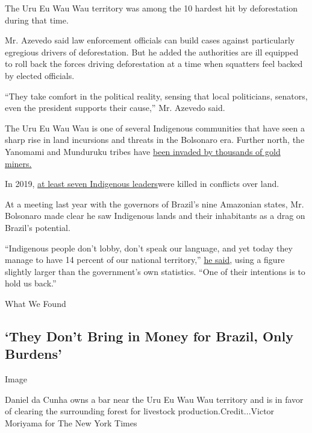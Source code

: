 The Uru Eu Wau Wau territory was among the 10 hardest hit by
deforestation during that time.

Mr. Azevedo said law enforcement officials can build cases against
particularly egregious drivers of deforestation. But he added the
authorities are ill equipped to roll back the forces driving
deforestation at a time when squatters feel backed by elected officials.

``They take comfort in the political reality, sensing that local
politicians, senators, even the president supports their cause,'' Mr.
Azevedo said.

The Uru Eu Wau Wau is one of several Indigenous communities that have
seen a sharp rise in land incursions and threats in the Bolsonaro era.
Further north, the Yanomami and Munduruku tribes have
\href{https://news.mongabay.com/2019/07/yanomami-amazon-reserve-invaded-by-20000-miners-bolsonaro-fails-to-act/}{been
invaded by thousands of gold miners.}

In 2019,
\href{https://g1.globo.com/natureza/noticia/2019/12/10/mortes-de-liderancas-indigenas-batem-recorde-em-2019-diz-pastoral-da-terra.ghtml}{at
least seven Indigenous leaders}were killed in conflicts over land.

At a meeting last year with the governors of Brazil's nine Amazonian
states, Mr. Bolsonaro made clear he saw Indigenous lands and their
inhabitants as a drag on Brazil's potential.

``Indigenous people don't lobby, don't speak our language, and yet today
they manage to have 14 percent of our national territory,''
\href{https://www.nytimes3xbfgragh.onion/2019/08/27/world/americas/bolsonaro-brazil-environment.html}{he
said}, using a figure slightly larger than the government's own
statistics. ``One of their intentions is to hold us back.''

What We Found

\hypertarget{they-dont-bring-in-money-for-brazil-only-burdens}{%
\subsection{`They Don't Bring in Money for Brazil, Only
Burdens'}\label{they-dont-bring-in-money-for-brazil-only-burdens}}

Image

Daniel da Cunha owns a bar near the Uru Eu Wau Wau territory and is in
favor of clearing the surrounding forest for livestock
production.Credit...Victor Moriyama for The New York Times

